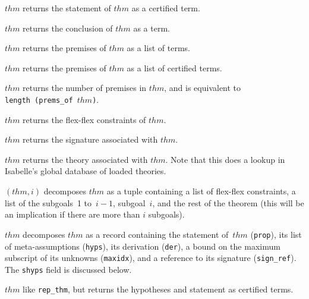 \begin{ttdescription}
\item[\ttindexbold{cprop_of} $thm$] returns the statement of $thm$ as
  a certified term.
  
\item[\ttindexbold{concl_of} $thm$] returns the conclusion of $thm$ as
  a term.
  
\item[\ttindexbold{prems_of} $thm$] returns the premises of $thm$ as a
  list of terms.
  
\item[\ttindexbold{cprems_of} $thm$] returns the premises of $thm$ as
  a list of certified terms.

\item[\ttindexbold{nprems_of} $thm$] 
returns the number of premises in $thm$, and is equivalent to {\tt
  length~(prems_of~$thm$)}.

\item[\ttindexbold{tpairs_of} $thm$] returns the flex-flex constraints
  of $thm$.
  
\item[\ttindexbold{sign_of_thm} $thm$] returns the signature
  associated with $thm$.
  
\item[\ttindexbold{theory_of_thm} $thm$] returns the theory associated
  with $thm$.  Note that this does a lookup in Isabelle's global
  database of loaded theories.

\item[\ttindexbold{dest_state} $(thm,i)$] 
decomposes $thm$ as a tuple containing a list of flex-flex constraints, a
list of the subgoals~1 to~$i-1$, subgoal~$i$, and the rest of the theorem
(this will be an implication if there are more than $i$ subgoals).

\item[\ttindexbold{rep_thm} $thm$] decomposes $thm$ as a record
  containing the statement of~$thm$ ({\tt prop}), its list of
  meta-assumptions ({\tt hyps}), its derivation ({\tt der}), a bound
  on the maximum subscript of its unknowns ({\tt maxidx}), and a
  reference to its signature ({\tt sign_ref}).  The {\tt shyps} field
  is discussed below.
  
\item[\ttindexbold{crep_thm} $thm$] like \texttt{rep_thm}, but returns
  the hypotheses and statement as certified terms.

\end{ttdescription}


